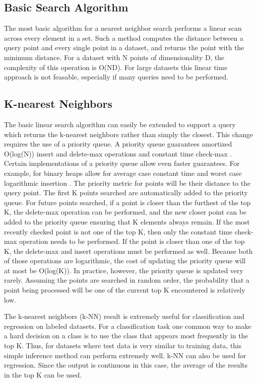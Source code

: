 \subsection{Basic Search Algorithm}
\label{sec:linear}

The most basic algorithm for a nearest neighbor search performs a linear scan across every element in a set.  Such a method computes the distance between a query point and every single point in a dataset, and returns the point with the minimum distance.  For a dataset with N points of dimensionality D, the complexity of this operation is O(ND).  For large datasets this linear time approach is not feasable, especially if many queries need to be performed.

\subsection{K-nearest Neighbors}
\label{subsec:knn}

The basic linear search algorithm can easily be extended to support a query which returns the k-nearest neighbors rather than simply the closest.  This change requires the use of a priority queue.  A priority queue guarantees amortized O(log(N)) insert and delete-max operations and constant time check-max \citep{van1976design}.  Certain implementations of a priority queue allow even faster guarantees.  For example, for binary heaps allow for average case constant time and worst case logarithmic insertion \citep{carlsson1988implicit}.  The priority metric for points will be their distance to the query point.  The first K points searched are automatically added to the priority queue.  For future points searched, if a point is closer than the furthest of the top K, the delete-max operation can be performed, and the new closer point can be added to the priority queue ensuring that K elements always remain.  If the most recently checked point is not one of the top K, then only the constant time check-max operation needs to be performed.  If the point is closer than one of the top K, the delete-max and insert operations must be performed as well.  Because both of those operations are logarithmic, the cost of updating the priority queue will at most be O(log(K)).  In practice, however, the priority queue is updated very rarely.  Assuming the points are searched in random order, the probability that a point being processed will be one of the current top K encountered is relatively low.

The k-nearest neighbors (k-NN) result is extremely useful for classification and regression on labeled datasets.  For a classification task one common way to make a hard decision on a class is to use the class that appears most frequently in the top K.  Thus, for datasets where test data is very similar to training data, this simple inference method can perform extremely well.  k-NN can also be used for regression.  Since the output is continuous in this case, the average of the results in the top K can be used.

